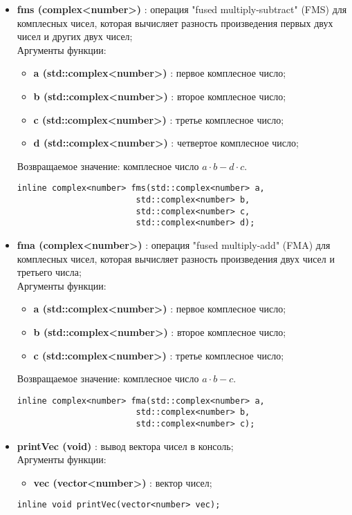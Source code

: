 \documentclass[a4paper,12pt]{article}
\begin{document}
\begin{itemize}
    \item \textbf{fms (complex<number>)} : операция "fused multiply-subtract" (FMS) для комплесных чисел, которая вычисляет разность произведения первых двух чисел и других двух чисел;
    \\Аргументы функции:
    \begin{itemize}
        \renewcommand{\labelitemi}{-}
        \item \textbf{a (std::complex<number>)} : первое комплесное число;
        \item \textbf{b (std::complex<number>)} : второе комплесное число;
        \item \textbf{c (std::complex<number>)} : третье комплесное число;
        \item \textbf{d (std::complex<number>)} : четвертое комплесное число;
    \end{itemize}
    Возвращаемое значение: комплесное число $a\cdot b - d \cdot c$.
    \begin{lstlisting}[language=С++]
inline complex<number> fms(std::complex<number> a, 
                        std::complex<number> b, 
                        std::complex<number> c,
                        std::complex<number> d); \end{lstlisting}


    \item \textbf{fma (complex<number>)} : операция "fused multiply-add" (FMA) для комплесных чисел, которая вычисляет разность произведения двух чисел и третьего числа;
    \\Аргументы функции:
    \begin{itemize}
        \renewcommand{\labelitemi}{-}
        \item \textbf{a (std::complex<number>)} : первое комплесное число;
        \item \textbf{b (std::complex<number>)} : второе комплесное число;
        \item \textbf{c (std::complex<number>)} : третье комплесное число;
    \end{itemize}
    Возвращаемое значение: комплесное число $a\cdot b - c$.
    \begin{lstlisting}[language=С++]
inline complex<number> fma(std::complex<number> a, 
                        std::complex<number> b, 
                        std::complex<number> c); \end{lstlisting}

    \item \textbf{printVec (void)} : вывод вектора чисел в консоль;
    \\Аргументы функции:
    \begin{itemize}
        \renewcommand{\labelitemi}{-}
        \item \textbf{vec (vector<number>)} : вектор чисел;
    \end{itemize}
    \begin{lstlisting}[language=С++]
inline void printVec(vector<number> vec); \end{lstlisting}


\end{itemize}
\end{document}
